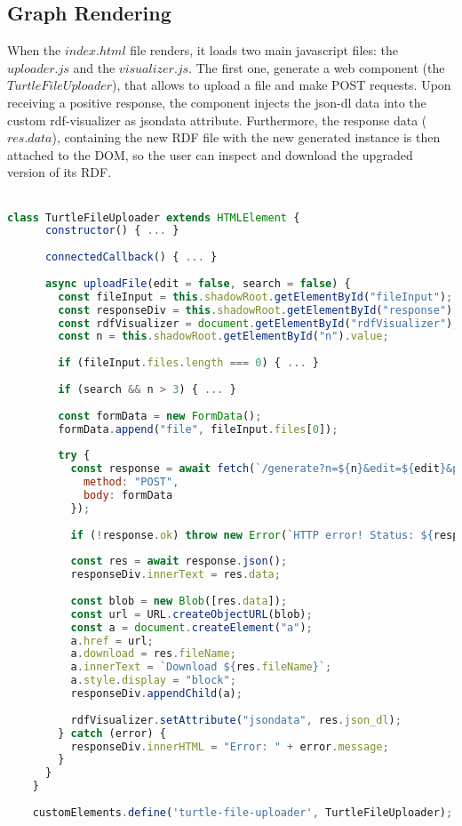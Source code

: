 \subsection{Graph Rendering}
When the $index.html$ file renders, it loads two main javascript files: the $uploader.js$ and the $visualizer.js$.
The first one, generate a web component (the $TurtleFileUploader$), that allows to upload a file and make POST requests. Upon receiving a positive response, the component injects the json-dl data into the custom rdf-visualizer as jsondata attribute. 
Furthermore, the response data ($res.data$), containing the new RDF file with the new generated instance is then attached to the DOM, so the user can inspect and download the upgraded version of its RDF.
\\
\\
\begin{lstlisting}[caption={\texttt{TurtleFileUploader} component}, label={lst:turtle-file-uploader}, language=JavaScript]
	class TurtleFileUploader extends HTMLElement {
	  constructor() { ... }
	
	  connectedCallback() { ... }
	
	  async uploadFile(edit = false, search = false) {
		const fileInput = this.shadowRoot.getElementById("fileInput");
		const responseDiv = this.shadowRoot.getElementById("response");
		const rdfVisualizer = document.getElementById("rdfVisualizer");
		const n = this.shadowRoot.getElementById("n").value;
	
		if (fileInput.files.length === 0) { ... }
	
		if (search && n > 3) { ... }
	
		const formData = new FormData();
		formData.append("file", fileInput.files[0]);
	
		try {
		  const response = await fetch(`/generate?n=${n}&edit=${edit}&property_search=${search}`, {
			method: "POST",
			body: formData
		  });
	
		  if (!response.ok) throw new Error(`HTTP error! Status: ${response.status}`);
	
		  const res = await response.json();
		  responseDiv.innerText = res.data;
	
		  const blob = new Blob([res.data]);
		  const url = URL.createObjectURL(blob);
		  const a = document.createElement("a");
		  a.href = url;
		  a.download = res.fileName;
		  a.innerText = `Download ${res.fileName}`;
		  a.style.display = "block";
		  responseDiv.appendChild(a);
	
		  rdfVisualizer.setAttribute("jsondata", res.json_dl);
		} catch (error) {
		  responseDiv.innerHTML = "Error: " + error.message;
		}
	  }
	}
	
	customElements.define('turtle-file-uploader', TurtleFileUploader);
	\end{lstlisting}
	

